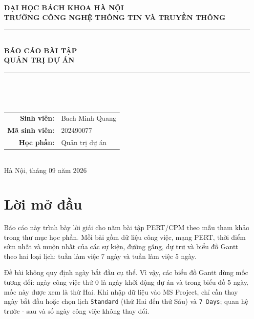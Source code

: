 \documentclass[12pt,a4paper]{article}
\begin{document}
\begin{titlepage}
\thispagestyle{empty}
\begin{center}
  {\large\bfseries ĐẠI HỌC BÁCH KHOA HÀ NỘI}\\[4pt]
  {\large\bfseries TRƯỜNG CÔNG NGHỆ THÔNG TIN VÀ TRUYỀN THÔNG}\\[1.5cm]
  \rule{\textwidth}{0.8pt}\\[0.55cm]
  {\Large\bfseries BÁO CÁO BÀI TẬP}\\[0.35cm]
  {\LARGE\bfseries QUẢN TRỊ DỰ ÁN}\\[0.55cm]
  \rule{\textwidth}{0.8pt}\\[1.5cm]
  \\[1.5cm]
  \begin{tabular}{rl}
    \textbf{Sinh viên:} & Bach Minh Quang\\
    \textbf{Mã sinh viên:} & 202490077\\
    \textbf{Học phần:} & Quản trị dự án\\
  \end{tabular}\\[2.0cm]
  {\large Hà Nội, tháng 09 năm 2026}
\end{center}
\end{titlepage}

\tableofcontents
\clearpage

\section*{Lời mở đầu}

Báo cáo này trình bày lời giải cho năm bài tập PERT/CPM theo mẫu tham khảo
trong thư mục học phần. Mỗi bài gồm dữ liệu công việc, mạng PERT, thời điểm
sớm nhất và muộn nhất của các sự kiện, đường găng, dự trữ và biểu đồ Gantt theo
hai loại lịch: tuần làm việc 7 ngày và tuần làm việc 5 ngày.

Đề bài không quy định ngày bắt đầu cụ thể. Vì vậy, các biểu đồ Gantt dùng mốc
tương đối: ngày công việc thứ 0 là ngày khởi động dự án và trong biểu đồ 5 ngày,
mốc này được xem là thứ Hai. Khi nhập dữ liệu vào MS Project, chỉ cần thay ngày
bắt đầu hoặc chọn lịch \texttt{Standard} (thứ Hai đến thứ Sáu) và \texttt{7 Days};
quan hệ trước - sau và số ngày công việc không thay đổi.
\end{document}
